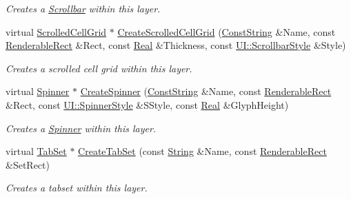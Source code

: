 \begin{DoxyCompactItemize}
\begin{DoxyCompactList}\small\item\em Creates a \hyperlink{classMezzanine_1_1UI_1_1Scrollbar}{Scrollbar} within this layer. \item\end{DoxyCompactList}\item 
virtual \hyperlink{classMezzanine_1_1UI_1_1ScrolledCellGrid}{ScrolledCellGrid} $\ast$ \hyperlink{classMezzanine_1_1UI_1_1Layer_af6e676e7aa1d918afabe3467c42dbfe8}{CreateScrolledCellGrid} (\hyperlink{namespaceMezzanine_a63cd699ac54b73953f35ec9cfc05e506}{ConstString} \&Name, const \hyperlink{structMezzanine_1_1UI_1_1RenderableRect}{RenderableRect} \&Rect, const \hyperlink{namespaceMezzanine_a726731b1a7df72bf3583e4a97282c6f6}{Real} \&Thickness, const \hyperlink{namespaceMezzanine_1_1UI_a5998a9bf372a7e92605c0c461736e763}{UI::ScrollbarStyle} \&Style)
\begin{DoxyCompactList}\small\item\em Creates a scrolled cell grid within this layer. \item\end{DoxyCompactList}\item 
virtual \hyperlink{classMezzanine_1_1UI_1_1Spinner}{Spinner} $\ast$ \hyperlink{classMezzanine_1_1UI_1_1Layer_a78a8ee333aee9ad5ce03228e41dbe3aa}{CreateSpinner} (\hyperlink{namespaceMezzanine_a63cd699ac54b73953f35ec9cfc05e506}{ConstString} \&Name, const \hyperlink{structMezzanine_1_1UI_1_1RenderableRect}{RenderableRect} \&Rect, const \hyperlink{namespaceMezzanine_1_1UI_a62462d4df783dcdda77e1590a96bc6d6}{UI::SpinnerStyle} \&SStyle, const \hyperlink{namespaceMezzanine_a726731b1a7df72bf3583e4a97282c6f6}{Real} \&GlyphHeight)
\begin{DoxyCompactList}\small\item\em Creates a \hyperlink{classMezzanine_1_1UI_1_1Spinner}{Spinner} within this layer. \item\end{DoxyCompactList}\item 
virtual \hyperlink{classMezzanine_1_1UI_1_1TabSet}{TabSet} $\ast$ \hyperlink{classMezzanine_1_1UI_1_1Layer_a1b153a3fa9ba59910ffa38118df07095}{CreateTabSet} (const \hyperlink{namespaceMezzanine_acf9fcc130e6ebf08e3d8491aebcf1c86}{String} \&Name, const \hyperlink{structMezzanine_1_1UI_1_1RenderableRect}{RenderableRect} \&SetRect)
\begin{DoxyCompactList}\small\item\em Creates a tabset within this layer. \item\end{DoxyCompactList}\item 

\end{DoxyCompactItemize}
